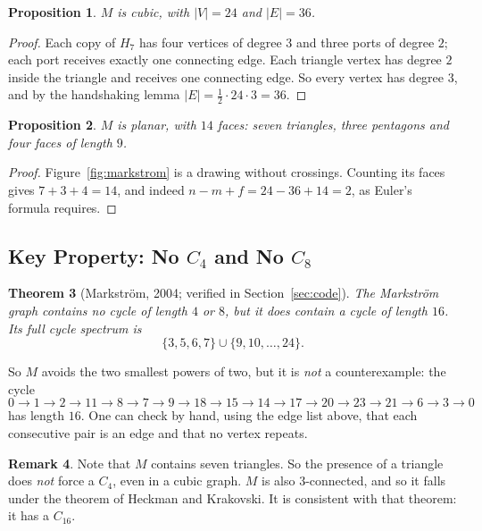\documentclass[11pt,a4paper]{article}
\newtheorem{theorem}{Theorem}[section]
\newtheorem{proposition}[theorem]{Proposition}
\theoremstyle{definition}
\newtheorem{remark}[theorem]{Remark}
\newcommand{\C}[1]{C_{#1}}
\begin{document}
\begin{proposition}
$M$ is cubic, with $|V|=24$ and $|E|=36$.
\end{proposition}

\begin{proof}
Each copy of $H_7$ has four vertices of degree $3$ and three ports of degree
$2$; each port receives exactly one connecting edge. Each triangle vertex has
degree $2$ inside the triangle and receives one connecting edge. So every
vertex has degree $3$, and by the handshaking lemma
$|E|=\tfrac12\cdot24\cdot3=36$.
\end{proof}

\begin{proposition}
$M$ is planar, with $14$ faces: seven triangles, three pentagons and four
faces of length $9$.
\end{proposition}

\begin{proof}
Figure~\ref{fig:markstrom} is a drawing without crossings. Counting its faces
gives $7+3+4=14$, and indeed $n-m+f=24-36+14=2$, as Euler's formula requires.
\end{proof}

\subsection{Key Property: No \texorpdfstring{$\C4$}{C4} and No \texorpdfstring{$\C8$}{C8}}

\begin{theorem}[Markstr\"om, 2004; verified in Section~\ref{sec:code}]
\label{thm:markstrom}
The Markstr\"om graph contains no cycle of length $4$ or $8$, but it does
contain a cycle of length $16$. Its full cycle spectrum is
\[
  \{3,5,6,7\}\cup\{9,10,\dots,24\}.
\]
\end{theorem}

So $M$ avoids the two smallest powers of two, but it is \emph{not} a
counterexample: the cycle
\[
  0\to1\to2\to11\to8\to7\to9\to18\to15\to14\to17\to20\to23\to21\to6\to3\to0
\]
has length $16$. One can check by hand, using the edge list above, that each
consecutive pair is an edge and that no vertex repeats.

\begin{remark}
Note that $M$ contains seven triangles. So the presence of a triangle does
\emph{not} force a $\C4$, even in a cubic graph. $M$ is also $3$-connected,
and so it falls under the theorem of Heckman and Krakovski. It is consistent
with that theorem: it has a $\C{16}$.
\end{remark}
\end{document}
